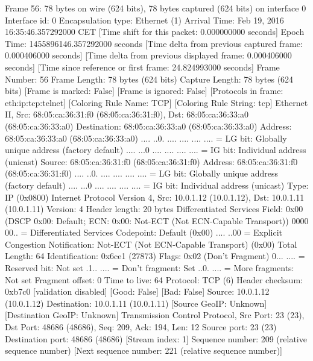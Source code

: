 Frame 56: 78 bytes on wire (624 bits), 78 bytes captured (624 bits) on interface 0
    Interface id: 0
    Encapsulation type: Ethernet (1)
    Arrival Time: Feb 19, 2016 16:35:46.357292000 CET
    [Time shift for this packet: 0.000000000 seconds]
    Epoch Time: 1455896146.357292000 seconds
    [Time delta from previous captured frame: 0.000406000 seconds]
    [Time delta from previous displayed frame: 0.000406000 seconds]
    [Time since reference or first frame: 24.824993000 seconds]
    Frame Number: 56
    Frame Length: 78 bytes (624 bits)
    Capture Length: 78 bytes (624 bits)
    [Frame is marked: False]
    [Frame is ignored: False]
    [Protocols in frame: eth:ip:tcp:telnet]
    [Coloring Rule Name: TCP]
    [Coloring Rule String: tcp]
Ethernet II, Src: 68:05:ca:36:31:f0 (68:05:ca:36:31:f0), Dst: 68:05:ca:36:33:a0 (68:05:ca:36:33:a0)
    Destination: 68:05:ca:36:33:a0 (68:05:ca:36:33:a0)
        Address: 68:05:ca:36:33:a0 (68:05:ca:36:33:a0)
        .... ..0. .... .... .... .... = LG bit: Globally unique address (factory default)
        .... ...0 .... .... .... .... = IG bit: Individual address (unicast)
    Source: 68:05:ca:36:31:f0 (68:05:ca:36:31:f0)
        Address: 68:05:ca:36:31:f0 (68:05:ca:36:31:f0)
        .... ..0. .... .... .... .... = LG bit: Globally unique address (factory default)
        .... ...0 .... .... .... .... = IG bit: Individual address (unicast)
    Type: IP (0x0800)
Internet Protocol Version 4, Src: 10.0.1.12 (10.0.1.12), Dst: 10.0.1.11 (10.0.1.11)
    Version: 4
    Header length: 20 bytes
    Differentiated Services Field: 0x00 (DSCP 0x00: Default; ECN: 0x00: Not-ECT (Not ECN-Capable Transport))
        0000 00.. = Differentiated Services Codepoint: Default (0x00)
        .... ..00 = Explicit Congestion Notification: Not-ECT (Not ECN-Capable Transport) (0x00)
    Total Length: 64
    Identification: 0x6ce1 (27873)
    Flags: 0x02 (Don't Fragment)
        0... .... = Reserved bit: Not set
        .1.. .... = Don't fragment: Set
        ..0. .... = More fragments: Not set
    Fragment offset: 0
    Time to live: 64
    Protocol: TCP (6)
    Header checksum: 0xb7c0 [validation disabled]
        [Good: False]
        [Bad: False]
    Source: 10.0.1.12 (10.0.1.12)
    Destination: 10.0.1.11 (10.0.1.11)
    [Source GeoIP: Unknown]
    [Destination GeoIP: Unknown]
Transmission Control Protocol, Src Port: 23 (23), Dst Port: 48686 (48686), Seq: 209, Ack: 194, Len: 12
    Source port: 23 (23)
    Destination port: 48686 (48686)
    [Stream index: 1]
    Sequence number: 209    (relative sequence number)
    [Next sequence number: 221    (relative sequence number)]
